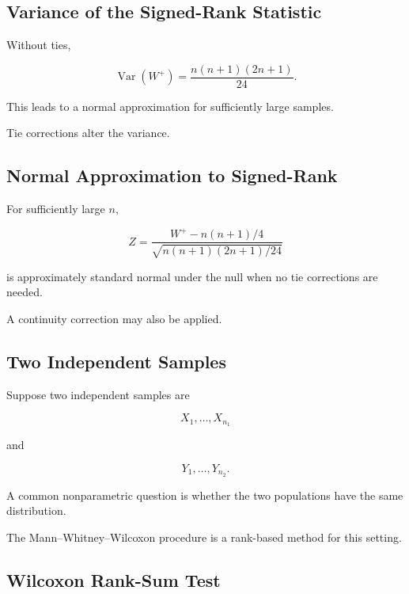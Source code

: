 \subsection{Variance of the Signed-Rank Statistic}
\label{subsec:variance-signed-rank}

Without ties,

\[
\boxed{
\operatorname{Var}(W^+)
=
\frac{
n(n+1)(2n+1)
}{
24
}.
}
\]

This leads to a normal approximation for sufficiently large samples.

Tie corrections alter the variance.

\subsection{Normal Approximation to Signed-Rank}
\label{subsec:normal-approx-signed-rank}

For sufficiently large \(n\),

\[
\boxed{
Z
=
\frac{
W^+
-
n(n+1)/4
}{
\sqrt{
n(n+1)(2n+1)/24
}
}
}
\]

is approximately standard normal under the null when no tie corrections
are needed.

A continuity correction may also be applied.

\subsection{Two Independent Samples}
\label{subsec:two-independent-nonparametric}

Suppose two independent samples are

\[
X_1,\ldots,X_{n_1}
\]

and

\[
Y_1,\ldots,Y_{n_2}.
\]

A common nonparametric question is whether the two populations have the
same distribution.

The Mann--Whitney--Wilcoxon procedure is a rank-based method for this
setting.

\subsection{Wilcoxon Rank-Sum Test}
\label{subsec:wilcoxon-rank-sum}

